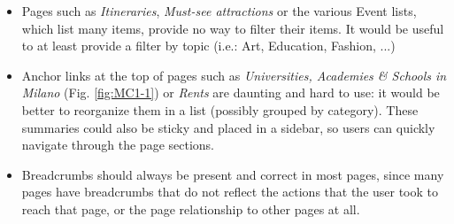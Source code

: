 \begin{itemize}
    \item Pages such as \emph{Itineraries}, \emph{Must-see attractions} or the various Event lists, which list many items, provide no way to filter their items. It would be useful to at least provide a filter by topic (i.e.: Art, Education, Fashion, ...)
    
    \item Anchor links at the top of pages such as \emph{Universities, Academies \& Schools in Milano} (Fig. \ref{fig:MC1-1}) or \emph{Rents} are daunting and hard to use: it would be better to reorganize them in a list (possibly grouped by category). These summaries could also be sticky and placed in a sidebar, so users can quickly navigate through the page sections.
    
    \item Breadcrumbs should always be present and correct in most pages, since many pages have breadcrumbs that do not reflect the actions that the user took to reach that page, or the page relationship to other pages at all.
\end{itemize}
